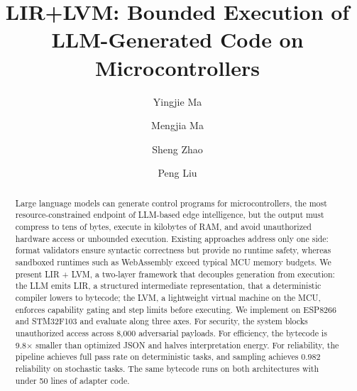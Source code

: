 \documentclass[a4paper,fleqn,longmktitle]{cas-dc}
\begin{document}
\title[mode = title]{LIR+LVM: Bounded Execution of LLM-Generated Code on Microcontrollers}

\tnotemark[1]

\author[1]{Yingjie Ma}
\fnmark[1]

\author[1]{Mengjia Ma}
\fnmark[2]

\author[1]{Sheng Zhao}
\fnmark[3]

\author[1]{Peng Liu}
\cormark[1]
\fnmark[4]


\fntext[fn1]{}
\fntext[fn2]{}
\fntext[fn3]{}
\fntext[fn4]{}

\begin{abstract}
Large language models can generate control programs for microcontrollers, the most resource-constrained endpoint of LLM-based edge intelligence, but the output must compress to tens of bytes, execute in kilobytes of RAM, and avoid unauthorized hardware access or unbounded execution. Existing approaches address only one side: format validators ensure syntactic correctness but provide no runtime safety, whereas sandboxed runtimes such as WebAssembly exceed typical MCU memory budgets.
We present LIR + LVM, a two-layer framework that decouples generation from execution: the LLM emits LIR, a structured intermediate representation, that a deterministic compiler lowers to bytecode; the LVM, a lightweight virtual machine on the MCU, enforces capability gating and step limits before executing. We implement on ESP8266 and STM32F103 and evaluate along three axes. For security, the system blocks unauthorized access across 8,000 adversarial payloads. For efficiency, the bytecode is 9.8$\times$ smaller than optimized JSON and halves interpretation energy. For reliability, the pipeline achieves full pass rate on deterministic tasks, and sampling achieves 0.982 reliability on stochastic tasks. The same bytecode runs on both architectures with under 50 lines of adapter code.
\end{abstract}
\end{document}
